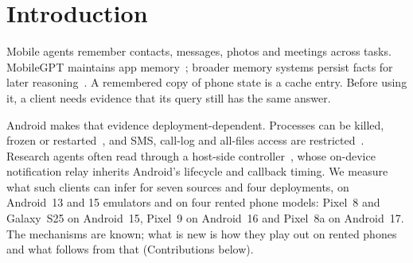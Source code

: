 \section{Introduction}
\label{sec:intro}

Mobile agents remember contacts, messages, photos and meetings across tasks. MobileGPT maintains app memory~\cite{lee2024mobilegpt}; broader memory systems persist facts for later reasoning~\cite{packer2023memgpt,chhikara2025mem0,rasmussen2025zep}. A remembered copy of phone state is a cache entry. Before using it, a client needs evidence that its query still has the same answer.

Android makes that evidence deployment-dependent. Processes can be killed, frozen or restarted~\cite{lebeck2020marvin,liang2020acclaim,android_freezer,android_doze}, and SMS, call-log and all-files access are restricted~\cite{play_smscalllog,play_allfiles}. Research agents often read through a host-side controller~\cite{rawles2025androidworld,zhang2025appagent,wang2024mobileagent}, whose on-device notification relay inherits Android's lifecycle and callback timing. We measure what such clients can infer for seven sources and four deployments, on Android~13 and 15 emulators and on four rented phone models: Pixel~8 and Galaxy~S25 on Android~15, Pixel~9 on Android~16 and Pixel~8a on Android~17. The mechanisms are known; what is new is how they play out on rented phones and what follows from that (Contributions below).

